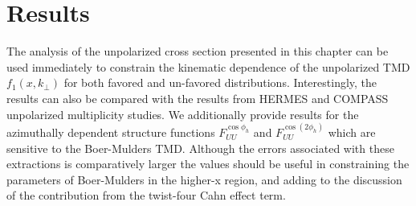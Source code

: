 \section{Results}
The analysis of the unpolarized cross section presented in this chapter can be used immediately to constrain the kinematic dependence of the unpolarized TMD $f_1 (x, k_{\perp})$ for both favored and un-favored distributions.  Interestingly, the results can also be compared with the results from HERMES and COMPASS unpolarized multiplicity studies.  We additionally provide results for the azimuthally dependent structure functions $F_{UU}^{\cos\phi_h}$ and $F_{UU}^{\cos(2\phi_h)}$ which are sensitive to the Boer-Mulders TMD.  Although the errors associated with these extractions is comparatively larger the values should be useful in constraining the parameters of Boer-Mulders in the higher-x region, and adding to the discussion of the contribution from the twist-four Cahn effect term.